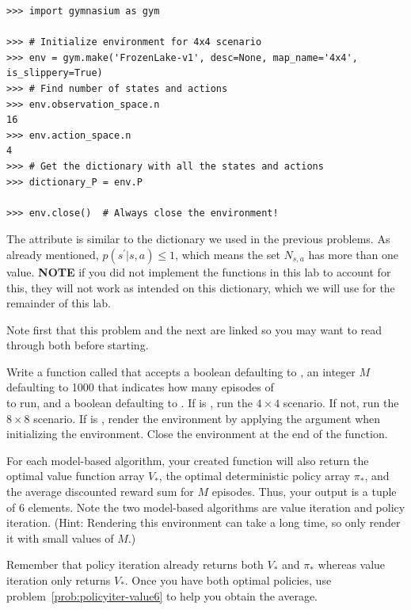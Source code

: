 \begin{lstlisting}
>>> import gymnasium as gym

>>> # Initialize environment for 4x4 scenario
>>> env = gym.make('FrozenLake-v1', desc=None, map_name='4x4', is_slippery=True)
>>> # Find number of states and actions
>>> env.observation_space.n
16
>>> env.action_space.n
4
>>> # Get the dictionary with all the states and actions
>>> dictionary_P = env.P

>>> env.close()  # Always close the environment!
\end{lstlisting}

The attribute  is similar to the dictionary we used in the previous problems.
As already mentioned, $p(s^\prime|s,a)\leq1$, which means the set $N_{s,a}$ has more than one value.
\textbf{NOTE} if you did not implement the functions in this lab to account for this, they will not work as intended on this dictionary, which we will use for the remainder of this lab.

\begin{problem}
\label{prob:policyiter-value5}
Note first that this problem and the next are linked so you may want to read through both before starting.

Write a function called  that accepts a boolean  defaulting to , an integer $M$ defaulting to 1000 that indicates how many episodes of \\  to run, and a boolean  defaulting to .
If  is , run the $4\times4$ scenario.
If not, run the $8\times8$ scenario.
If  is , render the environment by applying the argument  when initializing the environment.
Close the environment at the end of the function.

For each model-based algorithm, your created  function will also return the optimal value function array $V_*$, the optimal deterministic policy array $\pi_*$, and the average discounted reward sum for $M$ episodes.
Thus, your output is a tuple of 6 elements.
Note the two model-based algorithms are value iteration and policy iteration.
(Hint: Rendering this environment can take a long time, so only render it with small values of $M$.)

Remember that policy iteration already returns both $V_*$ and $\pi_*$ whereas value iteration only returns $V_*$.
Once you have both optimal policies, use problem\ \ref{prob:policyiter-value6} to help you obtain the average.
\end{problem}

